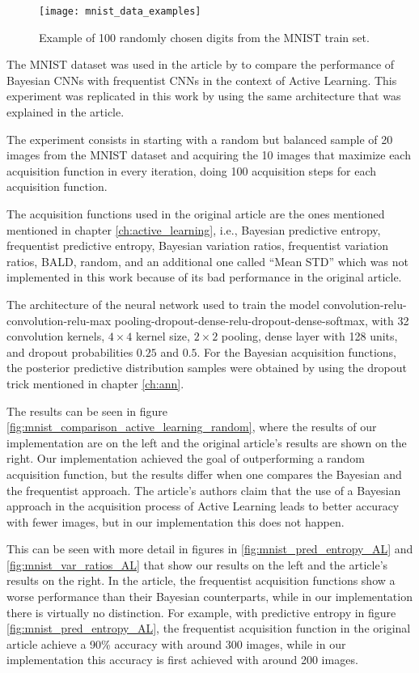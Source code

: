 \begin{figure}[H]
    \centering
    \texttt{[image: mnist\_data\_examples]}
    \caption{Example of 100 randomly chosen digits from the MNIST train set.}
    \label{fig:mnist_data_examples}
\end{figure}

The MNIST dataset was used in the article  by \citeauthor{Gal2016Active} to compare the performance of Bayesian CNNs with frequentist CNNs in the context of Active Learning. This experiment was replicated in this work by using the same architecture that was explained in the article.

The experiment consists in starting with a random but balanced sample of 20 images from the MNIST dataset and acquiring the 10 images that maximize each acquisition function in every iteration, doing 100 acquisition steps for each acquisition function.

The acquisition functions used in the original article are the ones mentioned mentioned in chapter \ref{ch:active_learning}, i.e., Bayesian predictive entropy, frequentist predictive entropy, Bayesian variation ratios, frequentist variation ratios, BALD, random, and an additional one called ``Mean STD'' which was not implemented in this work because of its bad performance in the original article.

The architecture of the neural network used to train the model convolution-relu-convolution-relu-max pooling-dropout-dense-relu-dropout-dense-softmax, with 32 convolution kernels, $4 \times 4$ kernel size, $2 \times 2$ pooling, dense layer with 128 units, and dropout probabilities $0.25$ and $0.5$. For the Bayesian acquisition functions, the posterior predictive distribution samples were obtained by using the dropout trick mentioned in chapter \ref{ch:ann}.

The results can be seen in figure \ref{fig:mnist_comparison_active_learning_random}, where the results of our implementation are on the left and the original article's results are shown on the right. Our implementation achieved the goal of outperforming a random acquisition function, but the results differ when one compares the Bayesian and the frequentist approach. The article's authors claim that the use of a Bayesian approach in the acquisition process of Active Learning leads to better accuracy with fewer images, but in our implementation this does not happen.

This can be seen with more detail in figures in \ref{fig:mnist_pred_entropy_AL} and \ref{fig:mnist_var_ratios_AL} that show our results on the left and the article's results on the right. In the article, the frequentist acquisition functions show a worse performance than their Bayesian counterparts, while in our implementation there is virtually no distinction. For example, with predictive entropy in figure \ref{fig:mnist_pred_entropy_AL}, the frequentist acquisition function in the original article achieve a 90\% accuracy with around 300 images, while in our implementation this accuracy is first achieved with around 200 images.

